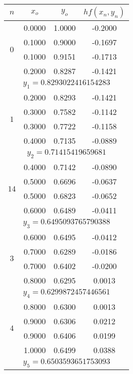 \begin{longtable}{|c|c|c|c|}\hline
$n$ & $x_o$ &$y_o$ &$hf(x_n,y_n)$ \\ \hline
\endhead

\multirow{4}{*}{$0$}
&0.0000 &1.0000 &-0.2000\\ \cline{2-4}
&0.1000 &0.9000 &-0.1697\\ \cline{2-4}
&0.1000 &0.9151 &-0.1713\\ \cline{2-4}
&0.2000 &0.8287 &-0.1421\\ \hline
\multicolumn{4}{|c|}{$y_1 = 0.8293022416154283$}\\ \hline

\multirow{4}{*}{$1$}
&0.2000 &0.8293 &-0.1421\\ \cline{2-4}
&0.3000 &0.7582 &-0.1142\\ \cline{2-4}
&0.3000 &0.7722 &-0.1158\\ \cline{2-4}
&0.4000 &0.7135 &-0.0889\\ \hline
\multicolumn{4}{|c|}{$y_2 = 0.71415419659681$}\\ \hline

\multirow{4}{*}{$14$}
&0.4000 &0.7142 &-0.0890\\ \cline{2-4}
&0.5000 &0.6696 &-0.0637\\ \cline{2-4}
&0.5000 &0.6823 &-0.0652\\ \cline{2-4}
&0.6000 &0.6489 &-0.0411\\ \hline
\multicolumn{4}{|c|}{$y_3 = 0.6495093765790388$}\\ \hline

\multirow{4}{*}{$3$}
&0.6000 &0.6495 &-0.0412\\ \cline{2-4}
&0.7000 &0.6289 &-0.0186\\ \cline{2-4}
&0.7000 &0.6402 &-0.0200\\ \cline{2-4}
&0.8000 &0.6295 &0.0013\\ \hline
\multicolumn{4}{|c|}{$y_4 = 0.6299872457446561$}\\ \hline

\multirow{4}{*}{$4$}
&0.8000 &0.6300 &0.0013\\ \cline{2-4}
&0.9000 &0.6306 &0.0212\\ \cline{2-4}
&0.9000 &0.6406 &0.0199\\ \cline{2-4}
&1.0000 &0.6499 &0.0388\\ \hline
\multicolumn{4}{|c|}{$y_5 = 0.6503593651753093$}\\ \hline

\end{longtable}


